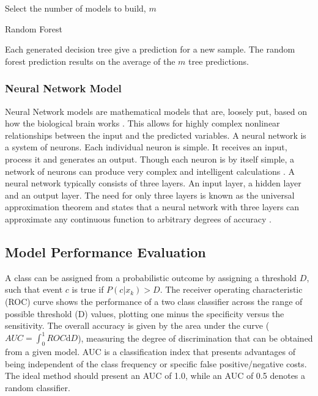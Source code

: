 \begin{algorithm}[H]
 Select the number of models to build, $m$\\
 \caption{Random Forest}
\label{alg:alg_rf}
\end{algorithm}
\vspace{5mm}

Each generated decision tree give a prediction for a new sample. The random forest prediction results on the average of the $m$ tree predictions.  
    	
    	\subsubsection{Neural Network Model}
    	\noindent Neural Network models are mathematical models that are, loosely put, based on how the biological brain works \citep{baesens2003using}. This allows for highly complex nonlinear relationships between the input and the predicted variables. 
    	A neural network is a system of neurons. Each individual neuron is simple. It receives an input, process it and generates an output. Though each neuron is by itself simple, a network of neurons can produce very complex and intelligent calculations \citep{shiffman2012nature}. 
    	A neural network typically consists of three layers. An input layer, a hidden layer and an output layer. The need for only three layers is known as the universal approximation theorem and states that a neural network with three layers can approximate any continuous function to arbitrary degrees of accuracy \citep{hornik1989multilayer}.
    \subsection{Model Performance Evaluation}
    \noindent A class can be assigned from a probabilistic outcome by assigning a threshold $D$, such that event $c$ is true if $P\left(c| x_k\right)>D$. The receiver operating characteristic (ROC) curve shows the performance of a two class classifier across the range of possible threshold (D) values, plotting one minus the specificity versus the sensitivity\citep{tom2006an}. The overall accuracy is given by the area under the curve ($AUC = \int_0^1ROC \mathrm{d}D$), measuring the degree of discrimination that can be obtained from a given model. AUC is a classification index\citep{david2011performance} that presents advantages of being independent of the class frequency or specific false positive/negative costs. The ideal method should present an AUC of 1.0, while an AUC of 0.5 denotes a random classifier.
    
